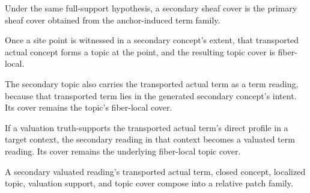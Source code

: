 \begin{theorem}\label{thm:claim-primary-sheaf-cover-from-anchor}\leanok{}
Under the same full-support hypothesis, a secondary sheaf cover is the primary
sheaf cover obtained from the anchor-induced term family.
\end{theorem}

\begin{theorem}\label{thm:claim-secondary-topic-cover}\leanok{}
Once a site point is witnessed in a secondary concept's extent, that transported
actual concept forms a topic at the point, and the resulting topic cover is
fiber-local.
\end{theorem}

\begin{theorem}\label{thm:claim-secondary-reading-cover}\leanok{}
The secondary topic also carries the transported actual term as a term reading,
because that transported term lies in the generated secondary concept's intent.
Its cover remains the topic's fiber-local cover.
\end{theorem}

\begin{theorem}\label{thm:claim-secondary-valuated-reading-cover}\leanok{}
If a valuation truth-supports the transported actual term's direct profile in a
target context, the secondary reading in that context becomes a valuated term
reading.  Its cover remains the underlying fiber-local topic cover.
\end{theorem}

\begin{proposition}\label{thm:claim-secondary-patch-family}\leanok{}
A secondary valuated reading's transported actual term, closed concept, localized
topic, valuation support, and topic cover compose into a relative patch family.
\end{proposition}

